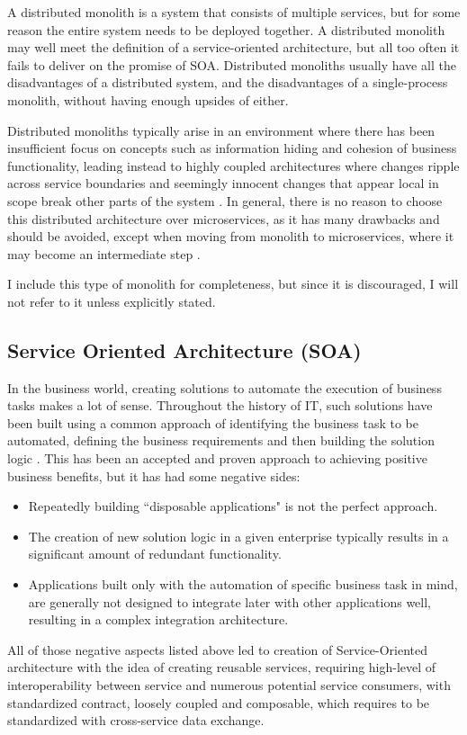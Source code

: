 A distributed monolith is a system that consists of multiple services, but for some reason the entire system needs to be deployed together. A distributed monolith may well meet the definition of a service-oriented architecture, but all too often it fails to deliver on the promise of SOA. Distributed monoliths usually have all the disadvantages of a distributed system, and the disadvantages of a single-process monolith, without having enough upsides of either. \cite{MON_TO_MS_MONOLITH}

Distributed monoliths typically arise in an environment where there has been insufficient focus on concepts such as information hiding and cohesion of business functionality, leading instead to highly coupled architectures where changes ripple across service boundaries and seemingly innocent changes that appear local in scope break other parts of the system \cite{MON_TO_MS_MONOLITH}. In general, there is no reason to choose this distributed architecture over microservices, as it has many drawbacks and should be avoided, except when moving from monolith to microservices, where it may become an intermediate step \cite{DIST_MON_WHICH_BUILDING}.

I include this type of monolith for completeness, but since it is discouraged, I will not refer to it unless explicitly stated.

\subsection{Service Oriented Architecture (SOA)}
In the business world, creating solutions to automate the execution of business tasks makes a lot of sense. Throughout the history of IT, such solutions have been built using a common approach of identifying the business task to be automated, defining the business requirements and then building the solution logic \cite{SERVICE_ORIENTED_ARCHITECTURE}. This has been an accepted and proven approach to achieving positive business benefits, but it has had some negative sides:
\begin{itemize}
    \item  Repeatedly building ``disposable applications" is not the perfect approach.
    \item  The creation of new solution logic in a given enterprise typically results in a significant amount of redundant functionality\cite{SERVICE_ORIENTED_ARCHITECTURE}.
    \item Applications built only with the automation of specific business task in mind, are generally not designed to integrate later with other applications well, resulting in a complex integration architecture.
\end{itemize}
All of those negative aspects listed above led to creation of Service-Oriented architecture with the idea of creating reusable services, requiring high-level of interoperability between service and numerous potential service consumers, with standardized contract, loosely coupled and composable, which requires to be standardized with cross-service data exchange.


